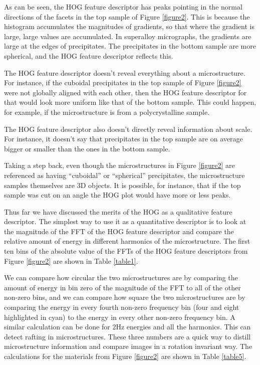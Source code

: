 \documentclass[review]{elsarticle}
\begin{document}
	As can be seen, the HOG feature descriptor has peaks pointing in the normal directions of the facets in the top sample of Figure \ref{figure2}. This is because the histogram accumulates the magnitudes of gradients, so that where the gradient is large, large values are accumulated. In superalloy micrographs, the gradients are large at the edges of precipitates. The precipitates in the bottom sample are more spherical, and the HOG feature descriptor reflects this.
	
	The HOG feature descriptor doesn't reveal everything about a microstructure. For instance, if the cuboidal precipitates in the top sample of Figure \ref{figure2} were not globally aligned with each other, then the HOG feature descriptor for that would look more uniform like that of the bottom sample. This could happen, for example, if the microstructure is from a polycrystalline sample.
	
	The HOG feature descriptor also doesn't directly reveal information about scale. For instance, it doesn't say that precipitates in the top sample are on average bigger or smaller than the ones in the bottom sample.
	
	Taking a step back, even though the microstructures in Figure \ref{figure2} are referenced as having ``cuboidal'' or ``spherical'' precipitates, the microstructure samples themselves are 3D objects. It is possible, for instance, that if the top sample was cut on an angle the HOG plot would have more or less peaks.

	Thus far we have discussed the merits of the HOG as a qualitative feature descriptor. The simplest way to use it as a quantitative descriptor is to look at the magnitude of the FFT of the HOG feature descriptor and compare the relative amount of energy in different harmonics of the microstructure. The first ten bins of the absolute value of the FFTs of the HOG feature descriptors from Figure \ref{figure2} are shown in Table \ref{table1}.
	
  	We can compare how circular the two microstructures are by comparing the amount of energy in bin zero of the magnitude of the FFT to all of the other non-zero bins, and we can compare how square the two microstructures are by comparing the energy in every fourth non-zero frequency bin (four and eight highlighted in cyan) to the energy in every other non-zero frequency bin. A similar calculation can be done for 2Hz energies and all the harmonics. This can detect rafting in microstructures. These three numbers are a quick way to distill microstructure information and compare images in a rotation invariant way. The calculations for the materials from Figure \ref{figure2} are shown in Table \ref{table5}.
	
\end{document}
